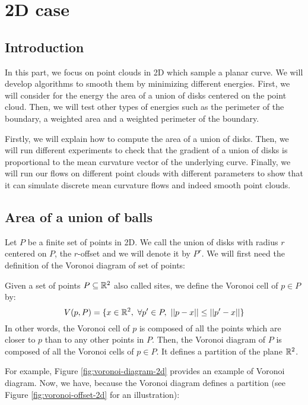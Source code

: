\chapter{2D case}
\label{chapter:2d}

\section{Introduction}

In this part, we focus on point clouds in 2D which sample a planar curve. We
will develop algorithms to smooth them by minimizing different energies. First,
we will consider for the energy the area of a union of disks centered on the
point cloud.  Then, we will test other types of energies such as the perimeter
of the boundary, a weighted area and a weighted perimeter of the boundary.

Firstly, we will explain how to compute the area of a union of disks. Then, we
will run different experiments to check that the gradient of a union of disks is
proportional to the mean curvature vector of the underlying curve. Finally, we
will run our flows on different point clouds with different parameters to show
that it can simulate discrete mean curvature flows and indeed smooth point
clouds.

\section{Area of a union of balls}

Let $ P $ be a finite set of points in 2D.  We call the union of disks with
radius $ r $ centered on $ P $, the $r$-offset and we will denote it by $ P^r $.
We will first need the definition of the Voronoi diagram of set of points:

\begin{definition}
    Given a set of points $ P \subseteq \mathbb{R}^2 $ also called sites, we define the
    Voronoi cell of $ p \in P $ by:
    $$ V(p, P) = \{ x \in \mathbb{R}^2,~ \forall p' \in P,~|| p  - x || \leq || p' -
    x || \} $$
    In other words, the Voronoi cell of $ p $ is composed of all the points
    which are closer to $ p $ than to any other points in $ P $.  Then, the
    Voronoi diagram of $ P $ is composed of all the Voronoi cells of $ p \in P
    $. It defines a partition of the plane $ \mathbb{R}^2 $.
\end{definition}

For example, Figure \ref{fig:voronoi-diagram-2d} provides an example of Voronoi
diagram. Now, we have, because the Voronoi diagram defines a partition (see
Figure \ref{fig:voronoi-offset-2d} for an illustration):

